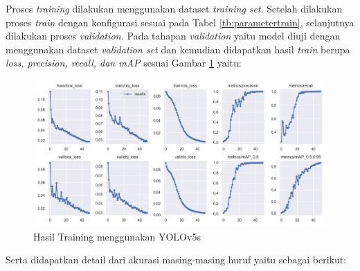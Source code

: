 Proses \textit{training} dilakukan menggunakan dataset \textit{training set}. Setelah dilakukan proses \textit{train} dengan konfigurasi sesuai pada Tabel \ref*{tb:parametertrain}, selanjutnya dilakukan proses \textit{validation.} Pada tahapan \textit{validation} yaitu model diuji dengan menggunakan dataset \textit{validation set} dan kemudian didapatkan hasil \textit{train} berupa \textit{loss, precision, recall, \textnormal{dan} mAP} sesuai Gambar \ref*{fig:trainresult} yaitu: \par

\begin{figure}[H]
  \centering
  \includegraphics[scale=0.5]{gambar/train_result.png}
  \caption{Hasil Training menggunakan YOLOv5s}
  \label{fig:trainresult}
\end{figure}

\noindent Serta didapatkan detail dari akurasi masing-masing huruf yaitu sebagai berikut: \par

